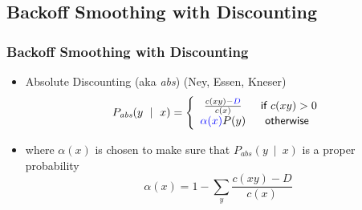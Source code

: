 \subsection{Backoff Smoothing with Discounting}

\begin{frame}
\frametitle{Backoff Smoothing with Discounting}
\begin{itemize}[<+->]
\item Absolute Discounting (aka \textit{abs}) (Ney, Essen, Kneser)
\[ P_{\textit{abs}}(y~\mid~x) = \left\{ 
\begin{array}{cc}
\frac{ c(xy) - {\color{blue}{D}} }{ c(x) } & \textsf{ if $c(xy) > 0$} \\
{\color{blue}{\alpha(x)}} P(y) & \textsf{otherwise}
\end{array}
\right. \]
\item where $\alpha(x)$ is chosen to make sure that $P_{\textit{abs}}(y~\mid~x)$ is a proper probability
\[ \alpha(x) = 1 - \sum_y \frac{ c(xy) - D }{ c(x) } \]
\end{itemize}
\end{frame}

